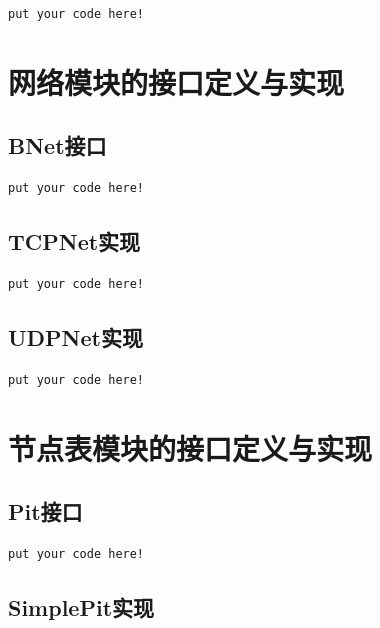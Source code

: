 \begin{lstlisting}[float,style=Go,caption=xxx]
	put your code here!
\end{lstlisting}

\section{网络模块的接口定义与实现}

\subsection{BNet接口}

\begin{lstlisting}[float,style=Go,caption=xxx]
	put your code here!
\end{lstlisting}

\subsection{TCPNet实现}

\begin{lstlisting}[float,style=Go,caption=xxx]
	put your code here!
\end{lstlisting}

\subsection{UDPNet实现}

\begin{lstlisting}[float,style=Go,caption=xxx]
	put your code here!
\end{lstlisting}

\section{节点表模块的接口定义与实现}

\subsection{Pit接口}

\begin{lstlisting}[float,style=Go,caption=xxx]
	put your code here!
\end{lstlisting}

\subsection{SimplePit实现}

